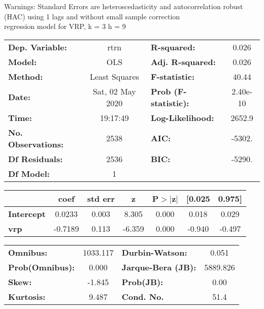 Warnings: \newline
 [1] Standard Errors are heteroscedasticity and autocorrelation robust (HAC) using 1 lags and without small sample correction\\ 

regression model for VRP, k = 3 h = 9\begin{center}
\begin{tabular}{lclc}
\toprule
\textbf{Dep. Variable:}    &       rtrn       & \textbf{  R-squared:         } &     0.026   \\
\textbf{Model:}            &       OLS        & \textbf{  Adj. R-squared:    } &     0.026   \\
\textbf{Method:}           &  Least Squares   & \textbf{  F-statistic:       } &     40.44   \\
\textbf{Date:}             & Sat, 02 May 2020 & \textbf{  Prob (F-statistic):} &  2.40e-10   \\
\textbf{Time:}             &     19:17:49     & \textbf{  Log-Likelihood:    } &    2652.9   \\
\textbf{No. Observations:} &        2538      & \textbf{  AIC:               } &    -5302.   \\
\textbf{Df Residuals:}     &        2536      & \textbf{  BIC:               } &    -5290.   \\
\textbf{Df Model:}         &           1      & \textbf{                     } &             \\
\bottomrule
\end{tabular}
\begin{tabular}{lcccccc}
                   & \textbf{coef} & \textbf{std err} & \textbf{z} & \textbf{P$> |$z$|$} & \textbf{[0.025} & \textbf{0.975]}  \\
\midrule
\textbf{Intercept} &       0.0233  &        0.003     &     8.305  &         0.000        &        0.018    &        0.029     \\
\textbf{vrp}       &      -0.7189  &        0.113     &    -6.359  &         0.000        &       -0.940    &       -0.497     \\
\bottomrule
\end{tabular}
\begin{tabular}{lclc}
\textbf{Omnibus:}       & 1033.117 & \textbf{  Durbin-Watson:     } &    0.051  \\
\textbf{Prob(Omnibus):} &   0.000  & \textbf{  Jarque-Bera (JB):  } & 5889.826  \\
\textbf{Skew:}          &  -1.845  & \textbf{  Prob(JB):          } &     0.00  \\
\textbf{Kurtosis:}      &   9.487  & \textbf{  Cond. No.          } &     51.4  \\
\bottomrule
\end{tabular}
\end{center}

